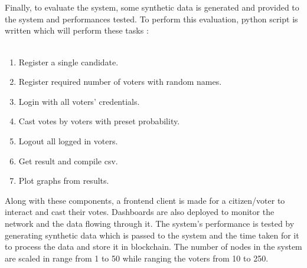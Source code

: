 \documentclass[oneside, 12pt]{book}
\begin{document}
\\\\Finally, to evaluate the system, some synthetic data is generated and provided to the system and performances tested. To perform this evaluation, python script is written which will perform these tasks :
\\\\\colorbox{gray!20}{%
	\begin{minipage}{\linewidth}%
		\vspace*{2pt}
		\begin{enumerate}
			\item Register a single candidate.
			\item Register required number of voters with random names.
			\item Login with all voters’ credentials.
			\item Cast votes by voters with preset probability.
			\item Logout all logged in voters.
			\item Get result and compile csv.
			\item Plot graphs from results.
		\end{enumerate}
		\vspace*{2pt}
	\end{minipage}%
}
\newpage
Along with these components, a frontend client is made for a citizen/voter to interact and cast their votes. Dashboards are also deployed to monitor the network and the data flowing through it. The system’s performance is tested by generating synthetic data which is passed to the system and the time taken for it to process the data and store it in blockchain. The number of nodes in the system are scaled in range from 1 to 50 while ranging the voters from 10 to 250.
\end{document}
